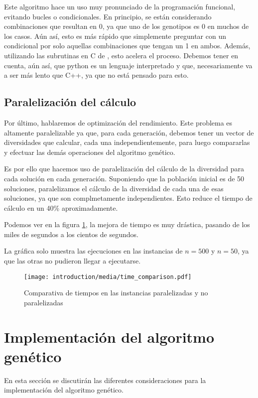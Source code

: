 Este algoritmo hace un uso muy pronunciado de la programación funcional, evitando bucles o condicionales. En principio, se están considerando combinaciones que resultan en 0, ya que uno de los genotipos es 0 en muchos de los casos. Aún así, esto es más rápido que simplemente preguntar con un condicional por solo aquellas combinaciones que tengan un 1 en ambos. Además, utilizando las subrutinas en C de , esto acelera el proceso. Debemos tener en cuenta, aún así, que python es un lenguaje interpretado y que, necesariamente va a ser más lento que C++, ya que no está pensado para esto.


\subsection{Paralelización del cálculo}
Por último, hablaremos de optimización del rendimiento. Este problema es altamente paralelizable ya que, para cada generación, debemos tener un vector de diversidades que calcular, cada una independientemente, para luego compararlas y efectuar las demás operaciones del algoritmo genético.

Es por ello que hacemos uso de paralelización del cálculo de la diversidad para cada solución en cada generación. Suponiendo que la población inicial es de 50 soluciones, paralelizamos el cálculo de la diversidad de cada una de esas soluciones, ya que son complmetamente independientes. Esto reduce el tiempo de cálculo en un 40\% aproximadamente. 

Podemos ver en la figura \ref{fig:time_comp}, la mejora de tiempo es muy drástica, pasando de los miles de segundos a los cientos de segundos. 

La gráfica solo muestra las ejecuciones en las instancias de $n = 500$ y $n = 50$, ya que las otras no pudieron llegar a ejecutarse.

\begin{figure}[h]
    \centering
    \texttt{[image: introduction/media/time\_comparison.pdf]}
    \caption{Comparativa de tiempos en las instancias paralelizadas y no paralelizadas}
    \label{fig:time_comp}
\end{figure}




\section{Implementación del algoritmo genético}
En esta sección se discutirán las diferentes consideraciones para la implementación del algoritmo genético.


